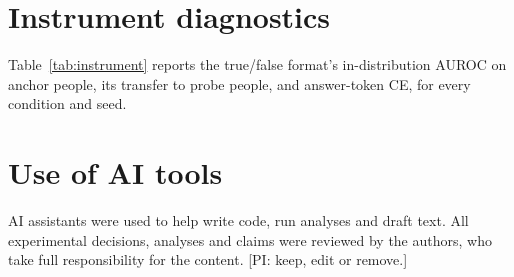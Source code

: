 \documentclass[10pt]{article}
\begin{document}
\begin{table}[t]
\centering
\caption{Selected steering cells (layer, site, $\alpha$, group): $w_{\mathrm{disc}}$ $\Delta s$ and manipulation-check $\Delta$M1 at epoch~8.}
\label{tab:steering}
\scriptsize

\end{table}

\section{Instrument diagnostics}
\label{app:instr}
Table~\ref{tab:instrument} reports the true/false format's in-distribution AUROC on anchor people, its transfer to probe people, and answer-token CE, for every condition and seed.

\begin{table}[t]
\centering
\caption{Instrument diagnostics by arm$\times$seed: probe J1 AUROC / $\Delta$, in-distribution anchor J1 AUROC, and judgment answer-token CE (epoch~8).}
\label{tab:instrument}
\small

\end{table}

\section{Use of AI tools}
\label{app:ai}
AI assistants were used to help write code, run analyses and draft text. All experimental decisions, analyses and claims were reviewed by the authors, who take full responsibility for the content. [PI: keep, edit or remove.]
\end{document}

